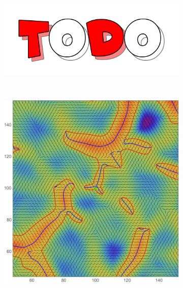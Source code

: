 \documentclass[a4paper, 11pt]{article}
\begin{document}
\begin{figure}
\begin{subfigure}[b]{0.3\textwidth}
\end{subfigure}~
\begin{subfigure}[b]{0.3\textwidth}
\includegraphics[width=\textwidth]{Todo}
\end{subfigure}\\
\begin{subfigure}[b]{0.3\textwidth}
\includegraphics[width=\textwidth]{Hyperbollic_L}
\end{subfigure}~
\begin{subfigure}[b]{0.3\textwidth}

\end{subfigure}
\end{figure}
\end{document}
